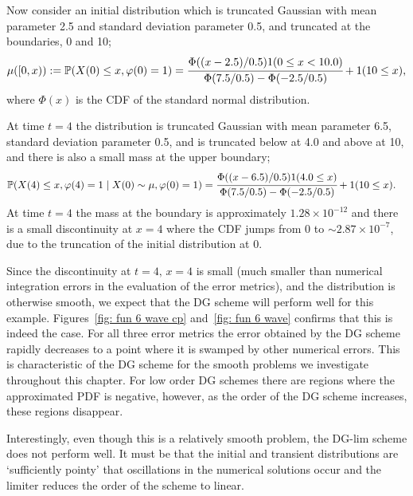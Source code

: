 \begin{example}\label{ex: wave 6}
	Now consider an initial distribution which is truncated Gaussian with mean parameter 2.5 and standard deviation parameter 0.5, and truncated at the boundaries, 0 and 10;
	\begin{align}
		\mu([0,x)) := \mathbb P(X(0)\leq x, \varphi(0)=1)=\cfrac{\Phi((x-2.5)/0.5)1(0 \leq x < 10.0)}{\Phi(7.5/0.5)-\Phi(-2.5/0.5)} + 1(10\leq x), \label{eqn: kdjfksdf}
	\end{align}
	where \(\Phi(x)\) is the CDF of the standard normal distribution.

	At time \(t=4\) the distribution is truncated Gaussian with mean parameter 6.5, standard deviation parameter 0.5, and is truncated below at 4.0 and above at 10, and there is also a small mass at the upper boundary; 
	\begin{align}
		&\mathbb P(X(4)\leq x, \varphi(4)=1\mid X(0)\sim\mu, \varphi(0)=1)  
		=\cfrac{\Phi((x-6.5)/0.5)1(4.0\leq x)}{\Phi(7.5/0.5)-\Phi(-2.5/0.5)} + 1(10 \leq x).\label{eqn: bbbbbaabbaa}%
	\end{align}
	At time \(t=4\) the mass at the boundary is approximately \(1.28\times 10^{-12}\) and there is a small discontinuity at \(x=4\) where the CDF jumps from \(0\) to \(\sim 2.87\times 10^{-7}\), due to the truncation of the initial distribution at \(0\). 

	Since the discontinuity at \(t=4,\,x=4\) is small (much smaller than numerical integration errors in the evaluation of the error metrics), and the distribution is otherwise smooth, we expect that the DG scheme will perform well for this example. Figures~\ref{fig: fun 6 wave cp} and~\ref{fig: fun 6 wave} confirms that this is indeed the case. For all three error metrics the error obtained by the DG scheme rapidly decreases to a point where it is swamped by other numerical errors. This is characteristic of the DG scheme for the smooth problems we investigate throughout this chapter. For low order DG schemes there are regions where the approximated PDF is negative, however, as the order of the DG scheme increases, these regions disappear. 
	
	Interestingly, even though this is a relatively smooth problem, the DG-lim scheme does not perform well. It must be that the initial and transient distributions are `sufficiently pointy' that oscillations in the numerical solutions occur and the limiter reduces the order of the scheme to linear. 
	

\end{example}
